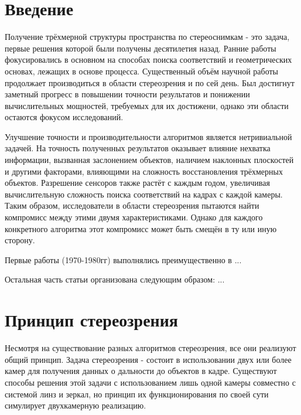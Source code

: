 





\tableofcontents
\newpage


\section{Введение}

Получение трёхмерной структуры пространства по стереоснимкам - это задача, первые решения которой
были получены десятилетия назад. Ранние работы фокусировались в основном на способах поиска соответствий
и геометрических основах, лежащих в основе процесса. Существенный объём научной работы продолжает
 производиться в области стереозрения и по сей день. Был достигнут заметный прогресс в повышении точности результатов и понижении вычислительных мощностей, требуемых для 
их достижени, однако эти области остаются фокусом исследований. 

Улучшение точности и производительности алгоритмов является нетривиальной задачей. На точность 
полученных результатов оказывает влияние нехватка информации, вызванная заслонением объектов, наличием наклонных
плоскостей и другими факторами, влияющими на сложность восстановления трёхмерных объектов. Разрешение
сенсоров также растёт с каждым годом, увеличивая вычислительную сложность поиска соответствий на кадрах с 
каждой камеры. Таким образом, исследователи в области стереозрения пытаются найти компромисс между этими
 двумя характеристиками. Однако для каждого конкретного алгоритма этот компромисс может быть смещён в 
 ту или иную сторону. 

Первые работы (1970-1980гг) выполнялись преимущественно в ...


Остальная часть статьи организована следующим образом:
...

\section{Принцип стереозрения}

Несмотря на существование разных алгоритмов стереозрения, все они реализуют общий принцип. Задача стереозрения - 
 состоит в использовании двух или более камер для получения данных о дальности до объектов в кадре. Существуют способы \cite{singlecamrev} решения
 этой задачи с использованием лишь одной камеры совместно с системой линз и зеркал, но принцип их функционирования по своей сути 
 симулирует двухкамерную реализацию.  %

